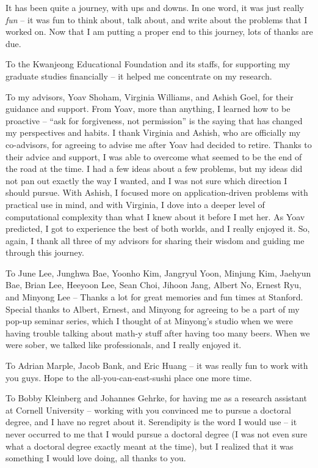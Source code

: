 It has been quite a journey, with ups and downs.
In one word, it was just really {\em fun} -- it was fun to think about, talk about, and write about the problems that I worked on. 
Now that I am putting a proper end to this journey, lots of thanks are due. 

To the Kwanjeong Educational Foundation and its staffs, for supporting my graduate studies financially -- it helped me concentrate on my research.

To my advisors, Yoav Shoham, Virginia Williams, and Ashish Goel, for their guidance and support. From Yoav, more than anything, I learned how to be proactive -- ``ask for forgiveness, not permission'' is the saying that has changed my perspectives and habits. I thank Virginia and Ashish, who are officially my co-advisors, for agreeing to advise me after Yoav had decided to retire. Thanks to their advice and support, I was able to overcome what seemed to be the end of the road at the time. I had a few ideas about a few problems, but my ideas did not pan out exactly the way I wanted, and I was not sure which direction I should pursue. With Ashish, I focused more on application-driven problems with practical use in mind, and with Virginia, I dove into a deeper level of computational complexity than what I knew about it before I met her. As Yoav predicted, I got to experience the best of both worlds, and I really enjoyed it. So, again, I thank all three of my advisors for sharing their wisdom and guiding me through this journey.

To June Lee, Junghwa Bae, Yoonho Kim, Jangryul Yoon, Minjung Kim, Jaehyun Bae, Brian Lee, Heeyoon Lee, Sean Choi, Jihoon Jang, Albert No, Ernest Ryu, and Minyong Lee -- Thanks a lot for great memories and fun times at Stanford. 
Special thanks to Albert, Ernest, and Minyong for agreeing to be a part of my pop-up seminar series, which I thought of at Minyong's studio when we were having trouble talking about math-y stuff after having too many beers. When we were sober, we talked like professionals, and I really enjoyed it. 

To Adrian Marple, Jacob Bank, and Eric Huang -- it was really fun to work with you guys. Hope to the all-you-can-east-sushi place one more time.


To Bobby Kleinberg and Johannes Gehrke, for having me as a research assistant at Cornell University -- working with you convinced me to pursue a doctoral degree, and I have no regret about it. Serendipity is the word I would use -- it never occurred to me that I would pursue a doctoral degree (I was not even sure what a doctoral degree exactly meant at the time), but I realized that it was something I would love doing, all thanks to you. 

